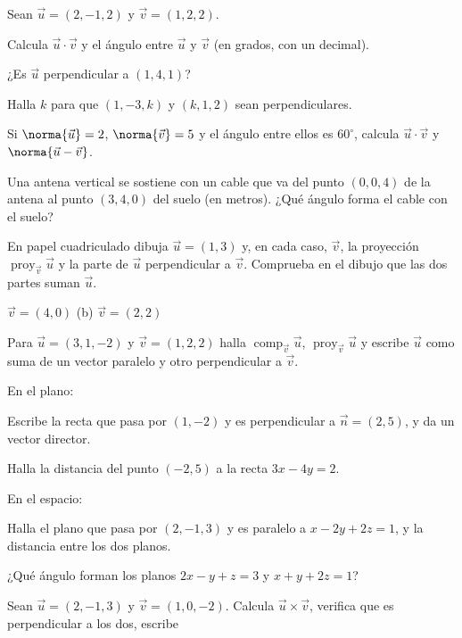 \documentclass[11pt,a4paper]{article}
\newcommand{\proy}{\operatorname{proy}}
\newcommand{\comp}{\operatorname{comp}}
\newcommand{\vu}{\vec{u}}\def\vv{\vec{v}}\newcommand{\vw}{\vec{w}}\newcommand{\vn}{\vec{n}}
\begin{document}
\taller
\begin{ejercicios}
\item Sean $\vu=(2,-1,2)$ y $\vv=(1,2,2)$.
  \begin{ejercicios}
  \item Calcula $\vu\cdot\vv$ y el ángulo entre $\vu$ y $\vv$ (en grados, con un decimal).
  \item ¿Es $\vu$ perpendicular a $(1,4,1)$?
  \item Halla $k$ para que $(1,-3,k)$ y $(k,1,2)$ sean perpendiculares.
  \end{ejercicios}
\item Si $\norma{\vu}=2$, $\norma{\vv}=5$ y el ángulo entre ellos es $60^\circ$, calcula $\vu\cdot\vv$ y $\norma{\vu-\vv}$.
\item Una antena vertical se sostiene con un cable que va del punto $(0,0,4)$ de la antena al punto $(3,4,0)$ del suelo
  (en metros). ¿Qué ángulo forma el cable con el suelo?
\item En papel cuadriculado dibuja $\vu=(1,3)$ y, en cada caso, $\vv$, la proyección $\proy_{\vv}\vu$ y la parte de
  $\vu$ perpendicular a $\vv$. Comprueba en el dibujo que las dos partes suman $\vu$.
  \begin{ejercicios}
  \item $\vv=(4,0)$ \qquad (b) $\vv=(2,2)$
  \end{ejercicios}
\item Para $\vu=(3,1,-2)$ y $\vv=(1,2,2)$ halla $\comp_{\vv}\vu$, $\proy_{\vv}\vu$ y escribe $\vu$ como suma de un
  vector paralelo y otro perpendicular a $\vv$.
\item En el plano:
  \begin{ejercicios}
  \item Escribe la recta que pasa por $(1,-2)$ y es perpendicular a $\vn=(2,5)$, y da un vector director.
  \item Halla la distancia del punto $(-2,5)$ a la recta $3x-4y=2$.
  \end{ejercicios}
\item En el espacio:
  \begin{ejercicios}
  \item Halla el plano que pasa por $(2,-1,3)$ y es paralelo a $x-2y+2z=1$, y la distancia entre los dos planos.
  \item ¿Qué ángulo forman los planos $2x-y+z=3$ y $x+y+2z=1$?
  \end{ejercicios}
\item Sean $\vu=(2,-1,3)$ y $\vv=(1,0,-2)$. Calcula $\vu\times\vv$, verifica que es perpendicular a los dos, escribe

\end{ejercicios}
\end{document}
